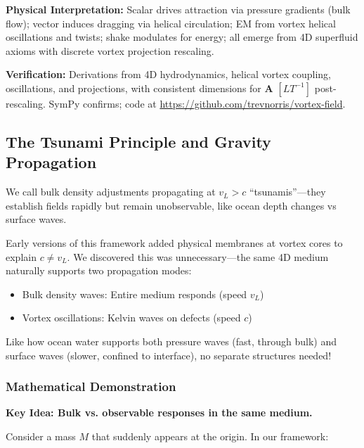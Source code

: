 \textbf{Physical Interpretation:} Scalar drives attraction via pressure gradients (bulk flow); vector induces dragging via helical circulation; EM from vortex helical oscillations and twists; shake modulates for energy; all emerge from 4D superfluid axioms with discrete vortex projection rescaling.

\textbf{Verification:} Derivations from 4D hydrodynamics, helical vortex coupling, oscillations, and projections, with consistent dimensions for $\mathbf{A}$ $[L T^{-1}]$ post-rescaling. SymPy confirms; code at \url{https://github.com/trevnorris/vortex-field}.

\subsection{The Tsunami Principle and Gravity Propagation}

We call bulk density adjustments propagating at $v_L > c$ ``tsunamis''---they establish fields rapidly but remain unobservable, like ocean depth changes vs surface waves.

\begin{tcolorbox}[title=Why Two Speeds Without Membranes]
Early versions of this framework added physical membranes at vortex cores
to explain $c \neq v_L$. We discovered this was unnecessary---the same 4D medium
naturally supports two propagation modes:

\begin{itemize}
\item Bulk density waves: Entire medium responds (speed $v_L$)
\item Vortex oscillations: Kelvin waves on defects (speed $c$)
\end{itemize}

Like how ocean water supports both pressure waves (fast, through bulk)
and surface waves (slower, confined to interface), no separate structures
needed!
\end{tcolorbox}

\subsubsection{Mathematical Demonstration}

\textbf{Key Idea: Bulk vs. observable responses in the same medium.}

Consider a mass $M$ that suddenly appears at the origin. In our framework:

